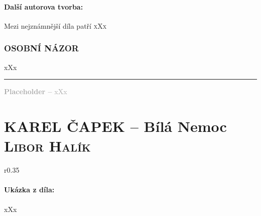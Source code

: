\documentclass[A4paper]{extarticle} %
\begin{document}
\subsection*{Další autorova tvorba:}
\noindent 
Mezi nejznámnější díla patří \textsc{xXx}






\section*{OSOBNÍ NÁZOR}
\noindent 
xXx

\vfill

\noindent\begin{minipage}{\textwidth}
    \textcolor{darkgray}{\rule{\linewidth}{0.4pt}
    \footnotesize
    \textbf{Placeholder --} xXx
    }
\end{minipage}

\newpage


\changefontsize{8pt}

\part*{KAREL ČAPEK -- Bílá Nemoc {\hfill \normalfont\tiny\textsc{Libor Halík}}}

\noindent\begin{wrapfigure}{r}{0.35\textwidth}
\tiny

\subsection*{Ukázka z díla:}
\setlength{\parindent}{3pt}
xXx
\end{wrapfigure}
\end{document}
